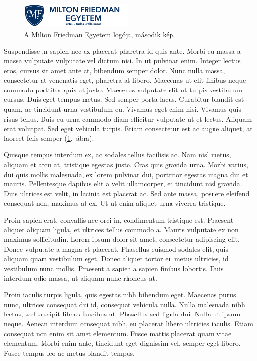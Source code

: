 \documentclass[a4paper,12pt]{article} %
\begin{document}
\begin{figure}[t]
\begin{center}
\includegraphics[width=0.5\textwidth]{MFE.png}
\caption{A Milton Friedman Egyetem logója, második kép.} \label{fig:mfe2}
\end{center}
\end{figure}

Suspendisse in sapien nec ex placerat pharetra id quis ante. Morbi eu massa a massa vulputate vulputate vel dictum nisi. In ut pulvinar enim. Integer lectus eros, cursus sit amet ante at, bibendum semper dolor. Nunc nulla massa, consectetur at venenatis eget, pharetra at libero. Maecenas ut elit finibus neque commodo porttitor quis at justo. Maecenas vulputate elit ut turpis vestibulum cursus. Duis eget tempus metus. Sed semper porta lacus. Curabitur blandit est quam, ac tincidunt urna vestibulum eu. Vivamus eget enim nisi. Vivamus quis risus tellus. Duis eu urna commodo diam efficitur vulputate ut et lectus. Aliquam erat volutpat. Sed eget vehicula turpis. Etiam consectetur est ac augue aliquet, at laoreet felis semper (\ref{fig:mfe2}.~ábra).

Quisque tempus interdum ex, ac sodales tellus facilisis ac. Nam nisl metus, aliquam et arcu at, tristique egestas justo. Cras quis gravida urna. Morbi varius, dui quis mollis malesuada, ex lorem pulvinar dui, porttitor egestas magna dui et mauris. Pellentesque dapibus elit a velit ullamcorper, et tincidunt nisl gravida. Duis ultrices est velit, in lacinia est placerat ac. Sed ante massa, posuere eleifend consequat non, maximus at ex. Ut ut enim aliquet urna viverra tristique.

Proin sapien erat, convallis nec orci in, condimentum tristique est. Praesent aliquet aliquam ligula, et ultrices tellus commodo a. Mauris vulputate ex non maximus sollicitudin. Lorem ipsum dolor sit amet, consectetur adipiscing elit. Donec vulputate a magna et placerat. Phasellus euismod sodales elit, quis aliquam quam vestibulum eget. Donec aliquet tortor eu metus ultricies, id vestibulum nunc mollis. Praesent a sapien a sapien finibus lobortis. Duis interdum odio massa, ut aliquam nunc rhoncus at.

Proin iaculis turpis ligula, quis egestas nibh bibendum eget. Maecenas purus nunc, ultrices consequat dui id, consequat vehicula nulla. Nulla malesuada nibh lectus, sed suscipit libero faucibus at. Phasellus sed ligula dui. Nulla ut ipsum neque. Aenean interdum consequat nibh, eu placerat libero ultricies iaculis. Etiam consequat non enim sit amet elementum. Fusce mattis placerat quam vitae elementum. Morbi enim ante, tincidunt eget dignissim vel, semper eget libero. Fusce tempus leo ac metus blandit tempus.
\end{document}
